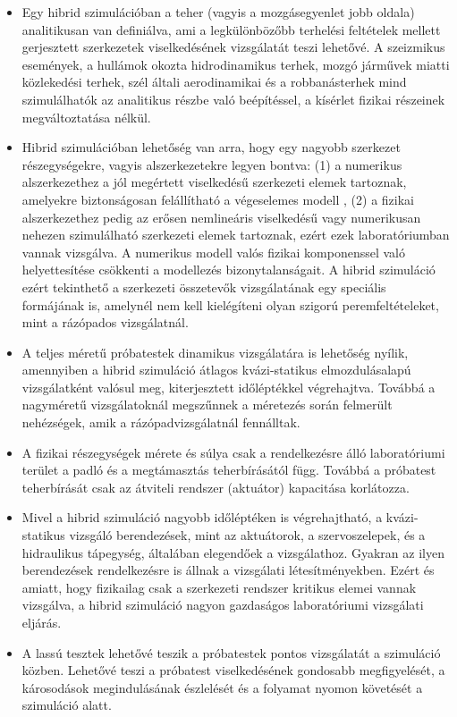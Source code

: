 \begin{itemize} 
\item Egy hibrid szimulációban a teher (vagyis a mozgásegyenlet jobb oldala) analitikusan van definiálva, ami a legkülönbözőbb terhelési feltételek mellett gerjesztett szerkezetek viselkedésének vizsgálatát teszi lehetővé. A szeizmikus események, a hullámok okozta hidrodinamikus terhek, mozgó járművek miatti közlekedési terhek, szél általi aerodinamikai és a robbanásterhek mind szimulálhatók az analitikus részbe való beépítéssel, a kísérlet fizikai részeinek megváltoztatása nélkül.
\item Hibrid szimulációban lehetőség van arra, hogy egy nagyobb szerkezet részegységekre, vagyis alszerkezetekre legyen bontva: (1) a numerikus alszerkezethez a jól megértett viselkedésű szerkezeti elemek tartoznak, amelyekre biztonságosan felállítható a végeselemes modell , (2) a fizikai alszerkezethez pedig az erősen nemlineáris viselkedésű vagy numerikusan nehezen szimulálható szerkezeti elemek tartoznak, ezért ezek laboratóriumban vannak vizsgálva. A numerikus modell valós fizikai komponenssel való helyettesítése csökkenti a modellezés bizonytalanságait. A hibrid szimuláció ezért tekinthető a szerkezeti összetevők vizsgálatának egy speciális formájának is, amelynél nem kell kielégíteni olyan szigorú peremfeltételeket, mint a rázópados vizsgálatnál.
\item A teljes méretű próbatestek dinamikus vizsgálatára is lehetőség nyílik, amennyiben a hibrid szimuláció átlagos kvázi-statikus elmozdulásalapú vizsgálatként valósul meg, kiterjesztett időléptékkel végrehajtva. Továbbá a nagyméretű vizsgálatoknál megszűnnek a méretezés során felmerült nehézségek, amik a rázópadvizsgálatnál fennálltak.
\item A fizikai részegységek mérete és súlya csak a rendelkezésre álló laboratóriumi terület a padló és a megtámasztás  teherbírásától függ. Továbbá a próbatest teherbírását csak az átviteli rendszer (aktuátor) kapacitása korlátozza.
\item Mivel a hibrid szimuláció nagyobb időléptéken is végrehajtható, a kvázi-statikus vizsgáló berendezések, mint az aktuátorok, a szervoszelepek, és a hidraulikus tápegység, általában elegendőek a vizsgálathoz. Gyakran az ilyen berendezések rendelkezésre is állnak a vizsgálati létesítményekben. Ezért és amiatt, hogy fizikailag  csak a szerkezeti rendszer kritikus elemei vannak vizsgálva, a hibrid szimuláció nagyon gazdaságos laboratóriumi vizsgálati eljárás.  
\item A lassú tesztek lehetővé teszik a próbatestek pontos vizsgálatát a szimuláció közben. Lehetővé teszi a próbatest viselkedésének gondosabb megfigyelését, a károsodások megindulásának észlelését és a folyamat nyomon követését a szimuláció alatt.

\end{itemize}
